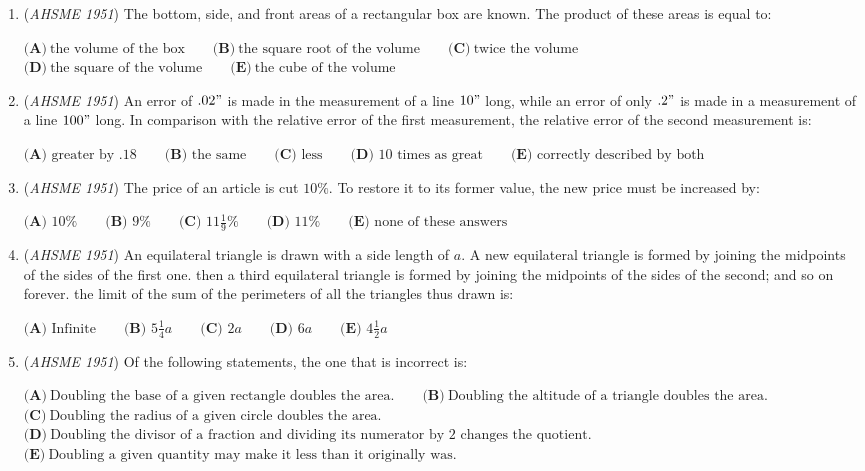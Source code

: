 \begin{enumerate}
	\item (\textit{AHSME 1951}) The bottom, side, and front areas of a rectangular box are known. The product of these areas is equal to:


 $\textbf{(A)}\ \text{the volume of the box} \qquad\textbf{(B)}\ \text{the square root of the volume} \qquad\textbf{(C)}\ \text{twice the volume}$
$\textbf{(D)}\ \text{the square of the volume} \qquad\textbf{(E)}\ \text{the cube of the volume}$


	\item (\textit{AHSME 1951}) An error of $.02"$ is made in the measurement of a line $10"$ long, while an error of only $.2"$ is made in a measurement of a line $100"$ long. In comparison with the relative error of the first measurement, the relative error of the second measurement is:


 $\textbf{(A) \ } \text{greater by }.18 \qquad\textbf{(B) \ } \text{the same} \qquad \textbf{(C) \ } \text{less} \qquad\textbf{(D) \ } 10\text{ times as great} \qquad\textbf{(E) \ } \text{correctly described by both}$


	\item (\textit{AHSME 1951}) The price of an article is cut $10 \%.$ To restore it to its former value, the new price must be increased by:


 $\textbf{(A) \ } 10 \% \qquad\textbf{(B) \ } 9 \% \qquad \textbf{(C) \ } 11\frac{1}{9} \% \qquad\textbf{(D) \ } 11 \% \qquad\textbf{(E) \ } \text{none of these answers}$


	\item (\textit{AHSME 1951}) An equilateral triangle is drawn with a side length of $a.$ A new equilateral triangle is formed by joining the midpoints of the sides of the first one. then a third equilateral triangle is formed by joining the midpoints of the sides of the second; and so on forever. the limit of the sum of the perimeters of all the triangles thus drawn is:


 $\textbf{(A) \ } \text{Infinite} \qquad\textbf{(B) \ } 5\frac{1}{4}a \qquad \textbf{(C) \ } 2a \qquad\textbf{(D) \ } 6a \qquad\textbf{(E) \ } 4\frac{1}{2}a$


	\item (\textit{AHSME 1951}) Of the following statements, the one that is incorrect is:


 $\textbf{(A)}\ \text{Doubling the base of a given rectangle doubles the area.}\qquad\textbf{(B)}\ \text{Doubling the altitude of a triangle doubles the area.}$
$\textbf{(C)}\ \text{Doubling the radius of a given circle doubles the area.}$
$\textbf{(D)}\ \text{Doubling the divisor of a fraction and dividing its numerator by 2 changes the quotient.}$
$\textbf{(E)}\ \text{Doubling a given quantity may make it less than it originally was.}$



\end{enumerate}

